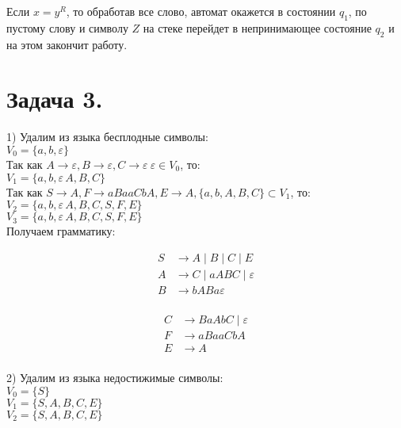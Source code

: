 \documentclass[12pt]{article}
\theoremstyle{definition}
\theoremstyle{definition}
\let\ra\rightarrow
\let\eps\varepsilon
\let\o\omega
\def\A{{\cal A}}
\begin{document}
	Если $x = y^R$, то обработав все слово, автомат окажется в состоянии $q_1$, по пустому слову и символу $Z$ на стеке перейдет в непринимающее состояние $q_2$ и на этом закончит работу.
\section*{Задача 3.}
1) Удалим из языка бесплодные символы:\\
\hspace*{1,5cm}$V_0 = \{a, b, \eps\}$ \\
\hspace*{0,5cm}Так как $A \ra \eps, B \ra \eps, C \ra \eps\ \eps \in V_0$, то:\\
\hspace*{1,5cm}$V_1 = \{a, b, \eps\, A, B, C\}$\\
\hspace*{0,5cm}Так как $S \ra A, F \ra aBaaCbA, E \ra A, \{a,b,A,B,C\} \subset V_1$, то:\\
\hspace*{1,5cm}$V_2 = \{a, b, \eps\, A, B, C, S, F, E\}$\\
\hspace*{1,5cm}$V_3 = \{a, b, \eps\, A, B, C, S, F, E\}$\\
\hspace*{0,5cm}Получаем грамматику:
\vspace{-3ex}
\begin{multicols}{2}
	\begin{align*}
		S &\to A \mid B \mid C \mid E \\
		A &\to C  \mid aABC \mid \eps\\
		B &\to bABa \eps\\
	\end{align*}

	\begin{align*}
		C &\to BaAbC \mid \eps\\
		F &\to aBaaCbA\\
		E &\to A\\			
	\end{align*}	
\end{multicols}
\vspace{-2ex}
2) Удалим из языка недостижимые символы:\\
\hspace*{1,5cm}$V_0 = \{S\}$\\
\hspace*{1,5cm}$V_1 = \{S, A, B, C, E\}$\\
\hspace*{1,5cm}$V_2 = \{S, A, B, C, E\}$\\
\end{document}
